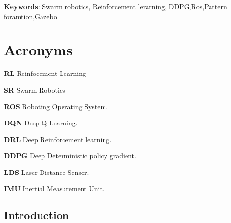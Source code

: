 \documentclass[12pt]{extarticle}
\begin{document}
\textbf{Keywords}: Swarm robotics, Reinforcement lerarning, DDPG,Ros,Pattern foramtion,Gazebo
\newpage
\thispagestyle{empty}
{
\hypersetup{linkcolor=false}
\tableofcontents

}




\newpage
\listoffigures
\listoftables
\clearpage

\newpage
\section*{Acronyms}

\hspace{0.5cm} \textbf{RL}  Reinfocement Learning

\vspace{0.2cm}

\textbf{SR} Swarm Robotics

\vspace{0.2cm}
\textbf{ROS} Roboting Operating System.

\vspace{0.2cm}

\textbf{DQN} Deep Q Learning.

\vspace{0.2cm}

\textbf{DRL} Deep Reinforcement learning.

\vspace{0.2cm}



\textbf{DDPG} Deep Deterministic policy gradient.

\vspace{0.2cm}

\textbf{LDS} Laser Distance Sensor.

\vspace{0.2cm}

\textbf{IMU} Inertial Measurement Unit.

\vspace{0.2cm}



  








\newpage
\pagebreak
\hspace{0pt}
\vfill
\begin{center}
\section{Introduction}
\end{center}
\vfill
\hspace{0pt}
\pagebreak
\end{document}
